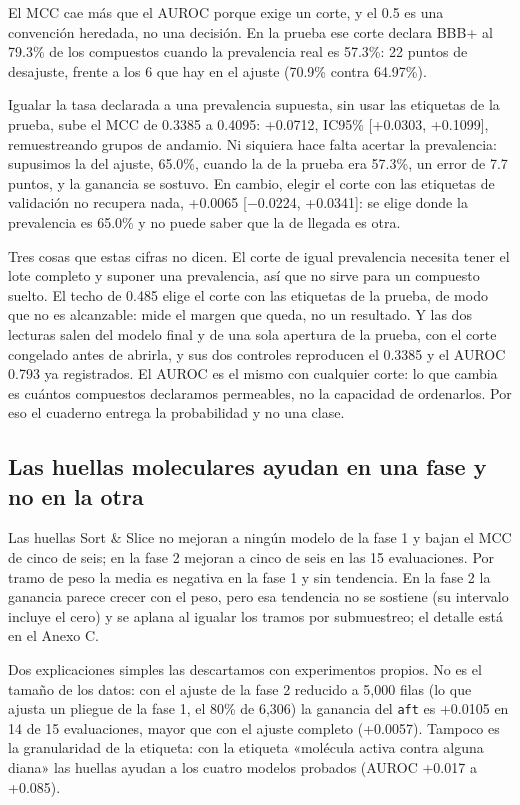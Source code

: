 \documentclass[letterpaper,11pt]{article}
\begin{document}
El MCC cae más que el AUROC porque exige un corte, y el 0.5 es una convención heredada, no una decisión. En la prueba ese corte declara BBB+ al 79.3\% de los compuestos cuando la prevalencia real es 57.3\%: 22 puntos de desajuste, frente a los 6 que hay en el ajuste (70.9\% contra 64.97\%).

Igualar la tasa declarada a una prevalencia supuesta, sin usar las etiquetas de la prueba, sube el MCC de 0.3385 a 0.4095: +0.0712, IC95\% {[}+0.0303, +0.1099{]}, remuestreando grupos de andamio. Ni siquiera hace falta acertar la prevalencia: supusimos la del ajuste, 65.0\%, cuando la de la prueba era 57.3\%, un error de 7.7 puntos, y la ganancia se sostuvo. En cambio, elegir el corte con las etiquetas de validación no recupera nada, +0.0065 {[}−0.0224, +0.0341{]}: se elige donde la prevalencia es 65.0\% y no puede saber que la de llegada es otra.

Tres cosas que estas cifras no dicen. El corte de igual prevalencia necesita tener el lote completo y suponer una prevalencia, así que no sirve para un compuesto suelto. El techo de 0.485 elige el corte con las etiquetas de la prueba, de modo que no es alcanzable: mide el margen que queda, no un resultado. Y las dos lecturas salen del modelo final y de una sola apertura de la prueba, con el corte congelado antes de abrirla, y sus dos controles reproducen el 0.3385 y el AUROC 0.793 ya registrados. El AUROC es el mismo con cualquier corte: lo que cambia es cuántos compuestos declaramos permeables, no la capacidad de ordenarlos. Por eso el cuaderno entrega la probabilidad y no una clase.

\subsection{Las huellas moleculares ayudan en una fase y no en la otra}

Las huellas Sort \& Slice no mejoran a ningún modelo de la fase 1 y bajan el MCC de cinco de seis; en la fase 2 mejoran a cinco de seis en las 15 evaluaciones. Por tramo de peso la media es negativa en la fase 1 y sin tendencia. En la fase 2 la ganancia parece crecer con el peso, pero esa tendencia no se sostiene (su intervalo incluye el cero) y se aplana al igualar los tramos por submuestreo; el detalle está en el Anexo C.

Dos explicaciones simples las descartamos con experimentos propios. No es el tamaño de los datos: con el ajuste de la fase 2 reducido a 5,000 filas (lo que ajusta un pliegue de la fase 1, el 80\% de 6,306) la ganancia del \texttt{aft} es +0.0105 en 14 de 15 evaluaciones, mayor que con el ajuste completo (+0.0057). Tampoco es la granularidad de la etiqueta: con la etiqueta «molécula activa contra alguna diana» las huellas ayudan a los cuatro modelos probados (AUROC +0.017 a +0.085).
\end{document}
